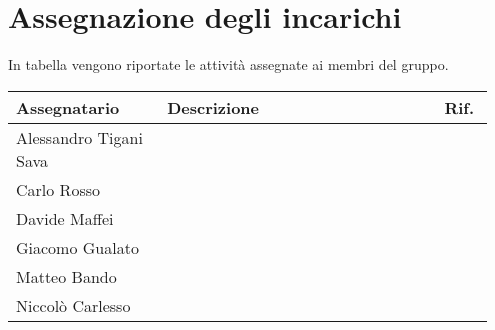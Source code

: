 \section{Assegnazione degli incarichi}
In tabella vengono riportate le attività assegnate ai membri del gruppo.
\begin{center}
	{
		\renewcommand{\arraystretch}{1.5}
		\begin{tabular}{p{0.30\linewidth}|p{0.55\linewidth}|p{0.10\linewidth}}
			\textbf{Assegnatario}        & \textbf{Descrizione} & \textbf{Rif.} \\

			\hline
			Alessandro Tigani Sava       &                      &               \\
			\hline
			\multirow{2}{*}{Carlo Rosso} &                      &               \\
			\cline{2-3}
			                             &                      &               \\
			\hline
			Davide Maffei                &                      &               \\
			\hline
			Giacomo Gualato & & \\
			\hline
			Matteo Bando                 &                      &               \\
			\hline
			Niccolò Carlesso             &                      &               \\
			\hline
		\end{tabular}
	}
\end{center}
